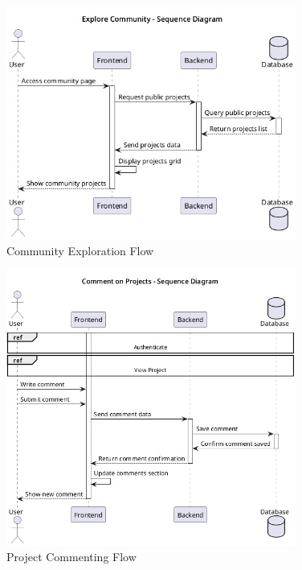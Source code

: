 \begin{figure}[H]
\centering
\includegraphics[width=0.85\textwidth]{conception/SprintV/sequence_diagrams/sequence_communityInteraction_6_1_ExploreCommunityAsUser.png}
\caption{Community Exploration Flow}
\label{fig:seq_explore_community}
\end{figure}

\begin{figure}[H]
\centering
\includegraphics[width=0.85\textwidth]{conception/SprintV/sequence_diagrams/sequence_communityInteraction_6_3_CommentOnProjects.png}
\caption{Project Commenting Flow}
\label{fig:seq_comment_projects}
\end{figure}

